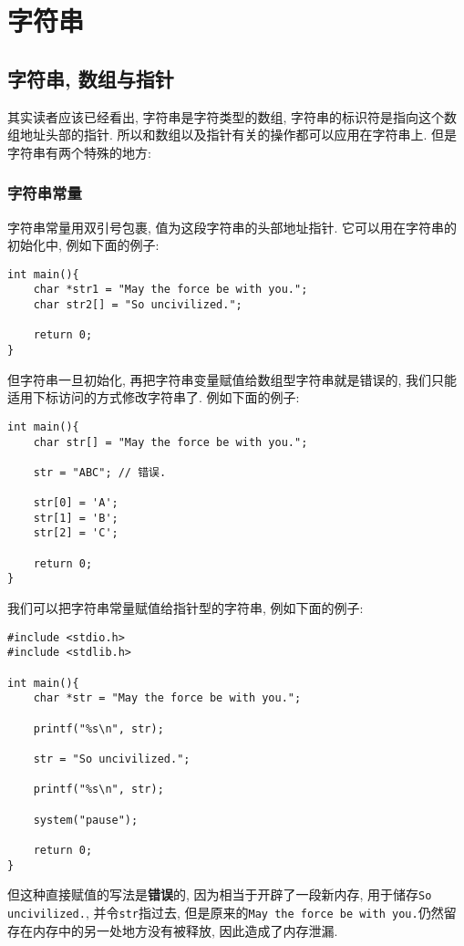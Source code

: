\chapter{字符串} \label{字符串}
    \section{字符串, 数组与指针}
        其实读者应该已经看出, 字符串是字符类型的数组, 字符串的标识符是指向这个数组地址头部的指针. 所以和数组以及指针有关的操作都可以应用在字符串上. 但是字符串有两个特殊的地方:

        \subsection*{字符串常量}
            字符串常量用双引号包裹, 值为这段字符串的头部地址指针. 它可以用在字符串的初始化中, 例如下面的例子:
\begin{lstlisting}
int main(){
    char *str1 = "May the force be with you.";
    char str2[] = "So uncivilized.";

    return 0;
}
\end{lstlisting}

            但字符串一旦初始化, 再把字符串变量赋值给数组型字符串就是错误的, 我们只能适用下标访问的方式修改字符串了. 例如下面的例子:
\begin{lstlisting}
int main(){
    char str[] = "May the force be with you.";

    str = "ABC"; // 错误.

    str[0] = 'A';
    str[1] = 'B';
    str[2] = 'C';

    return 0;
}
\end{lstlisting}

            \begin{mdframed}[linecolor=darkgray]

            我们可以把字符串常量赋值给指针型的字符串, 例如下面的例子:
\begin{lstlisting}
#include <stdio.h>
#include <stdlib.h>

int main(){
    char *str = "May the force be with you.";

    printf("%s\n", str);

    str = "So uncivilized."; 

    printf("%s\n", str);

    system("pause");

    return 0;
}
\end{lstlisting}

            \begin{sloppypar}
            但这种直接赋值的写法是\textbf{错误}的, 因为相当于开辟了一段新内存, 用于储存\texttt{So uncivilized.}, 并令\texttt{str}指过去, 但是原来的\texttt{May the force be with you.}仍然留存在内存中的另一处地方没有被释放, 因此造成了内存泄漏.
            \end{sloppypar}

            \end{mdframed}

